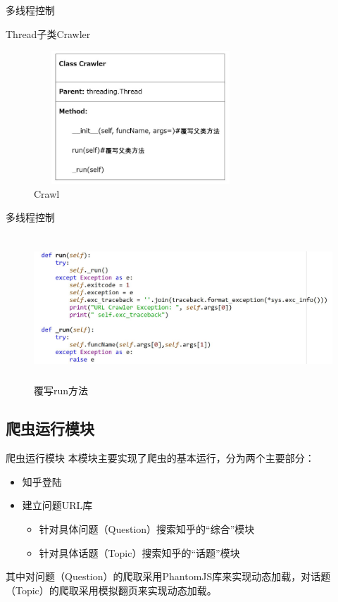 \documentclass[aspectratio=169]{beamer}
\begin{document}
\begin{frame}{多线程控制}
\begin{block}{Thread子类Crawler}\end{block}
\begin{figure}
  \centering
  \includegraphics[width=8cm,height=5cm]{Crawl}
  \caption{Crawl}
\end{figure}
\end{frame}

\begin{frame}{多线程控制}
\begin{figure}
  \centering
  \includegraphics[width=13cm,height=5.5cm]{覆写run方法}
  \caption{覆写run方法}
\end{figure}
\end{frame}

\subsection{爬虫运行模块}
\begin{frame}{爬虫运行模块}
本模块主要实现了爬虫的基本运行，分为两个主要部分：
\begin{itemize}
  \item 知乎登陆
  \item 建立问题URL库
  \begin{itemize}
    \item 针对具体问题（Question）搜索知乎的“综合”模块
    \item 针对具体话题（Topic）搜索知乎的“话题”模块
  \end{itemize}
\end{itemize}
其中对问题（Question）的爬取采用PhantomJS库来实现动态加载，对话题（Topic）的爬取采用模拟翻页来实现动态加载。
\end{frame}
\end{document}
